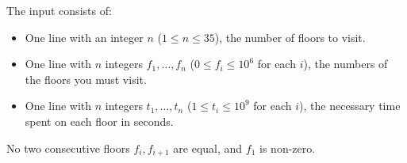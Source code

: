 
    The input consists of:
    \begin{itemize}
        \item One line with an integer $n$ ($1\leq n\leq 35$), the number of floors to visit.
        \item One line with $n$ integers $f_1,\ldots,f_n$ ($0\leq f_i\leq10^6$ for each $i$), the numbers of the floors you must visit.
        \item One line with $n$ integers $t_1,\ldots,t_n$ ($1\leq t_i\leq10^9$ for each $i$), the necessary time spent on each floor in seconds.
    \end{itemize}
    No two consecutive floors $f_i,f_{i+1}$ are equal, and $f_1$ is non-zero.
